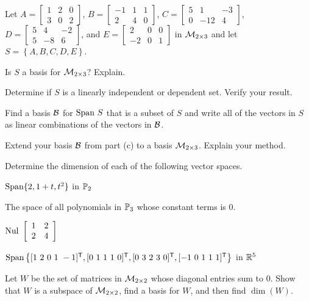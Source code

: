 	

\item Let $A = \left[ \begin{array}{ccc} 1&2&0 \\ 3&0&2 \end{array} \right]$, $B = \left[ \begin{array}{rcc} -1&1&1 \\ 2&4&0 \end{array} \right]$, $C= \left[ \begin{array}{crr} 5&1&-3 \\ 0&-12&4 \end{array} \right]$, $D = \left[ \begin{array}{crr} 5&4&-2 \\ 5&-8&6 \end{array} \right]$, and $E = \left[ \begin{array}{rcc} 2&0&0 \\ -2&0&1 \end{array} \right]$ in $\mathcal{M}_{2 \times 3}$ and let $S = \left\{ A, B, C, D, E \right\}$. 
	\ba
	\item Is $S$ a basis for $\mathcal{M}_{2 \times 3}$? Explain.
	\item Determine if $S$ is a linearly independent or dependent set. Verify your result.
	\item Find a basis $\mathcal{B}$ for $\text{Span} \ S$ that is a subset of $S$ and write all of the vectors in $S$ as linear combinations of the vectors in $\mathcal{B}$. 
	\item Extend your basis $\mathcal{B}$ from part (c) to a basis $\mathcal{M}_{2 \times 3}$. Explain your method. 
	\ea

	
\item Determine the dimension of each of the following vector spaces.
	\ba
	\item $\text{Span}\{2, 1+t, t^2\}$ in $\mathbb{P}_2$
	\item The space of all polynomials in $\mathbb{P}_3$ whose constant terms is 0. 
	\item $\text{Nul }  \left[ \begin{array}{cc} 1&2 \\ 2&4 \end{array} \right] $
	\item $\Span\left\{ [1 \ 2 \ 0 \ 1 \ -1]^{\tr}, [0 \ 1 \ 1 \ 1 \ 0]^{\tr},  [0 \ 3 \ 2 \ 3 \ 0]^{\tr}, [-1 \ 0 \ 1 \ 1 \ 1]^{\tr}\right\}$ in $\mathbb{R}^5$  
	\ea
	
\item Let $W$ be the set of matrices in $\mathcal{M}_{2 \times 2}$ whose diagonal entries sum to 0. Show that $W$ is a subspace of $\mathcal{M}_{2 \times 2}$, find a basis for $W$, and then find $\dim(W)$. 


